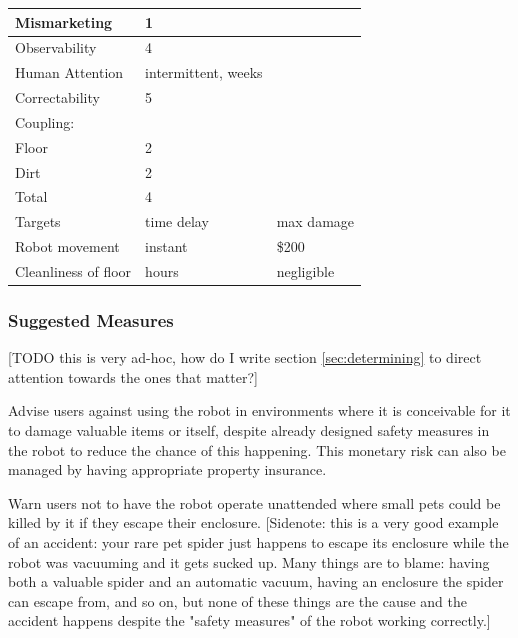 \documentclass[11pt]{article}
\begin{document}
\begin{center}
\begin{tabular}{ |l|l|l| } 
 \hline
 Mismarketing & 1 &\\
 \hline
 Observability & 4 &\\
 \hline
 Human Attention & intermittent, weeks &\\
 \hline
 Correctability & 5 &\\
 \hline
 Coupling: & &\\
 Floor & 2 &\\ 
 Dirt & 2 &\\
 Total & 4 &\\
 \hline
 \hline
 Targets & time delay & max damage \\
 \hline
 Robot movement & instant & \$200\\
 Cleanliness of floor & hours & negligible\\
 \hline
\end{tabular}
\end{center}

\subsubsection{Suggested Measures}

[TODO this is very ad-hoc, how do I write section \ref{sec:determining} to direct attention towards
the ones that matter?]

Advise users against using the robot in environments where it is conceivable for it to damage
valuable items or itself, despite already designed safety measures in the robot to reduce the chance
of this happening. This monetary risk can also be managed by having appropriate property insurance.

Warn users not to have the robot operate unattended where small pets could be killed by it if they
escape their enclosure. [Sidenote: this is a very good example of an accident: your rare pet spider
just happens to escape its enclosure while the robot was vacuuming and it gets sucked up. Many
things are to blame: having both a valuable spider and an automatic vacuum, having an enclosure the
spider can escape from, and so on, but none of these things are the cause and the accident happens
despite the "safety measures" of the robot working correctly.]


%
%






{}

\end{document}

